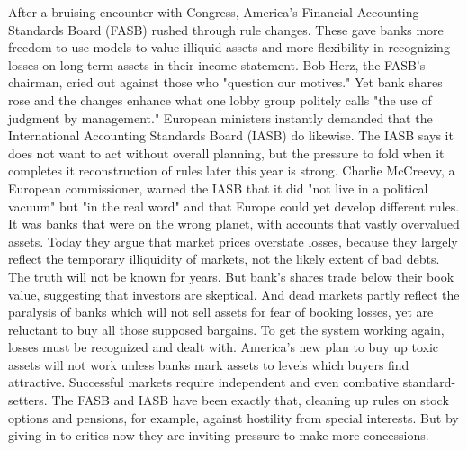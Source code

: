 After a bruising encounter with Congress, America's Financial Accounting Standards Board (FASB) rushed through rule changes. These gave banks more freedom to use models to value illiquid assets and more flexibility in recognizing losses on long-term assets in their income statement. Bob Herz, the FASB's chairman, cried out against those who "question our motives." Yet bank shares rose and the changes enhance what one lobby group politely calls "the use of judgment by management."
European ministers instantly demanded that the International Accounting Standards Board (IASB) do likewise. The IASB says it does not want to act without overall planning, but the pressure to fold when it completes it reconstruction of rules later this year is strong. Charlie McCreevy, a European commissioner, warned the IASB that it did "not live in a political vacuum" but "in the real word" and that Europe could yet develop different rules.
It was banks that were on the wrong planet, with accounts that vastly overvalued assets. Today they argue that market prices overstate losses, because they largely reflect the temporary illiquidity of markets, not the likely extent of bad debts. The truth will not be known for years. But bank's shares trade below their book value, suggesting that investors are skeptical. And dead markets partly reflect the paralysis of banks which will not sell assets for fear of booking losses, yet are reluctant to buy all those supposed bargains.
To get the system working again, losses must be recognized and dealt with. America's new plan to buy up toxic assets will not work unless banks mark assets to levels which buyers find attractive. Successful markets require independent and even combative standard-setters. The FASB and IASB have been exactly that, cleaning up rules on stock options and pensions, for example, against hostility from special interests. But by giving in to critics now they are inviting pressure to make more concessions.
